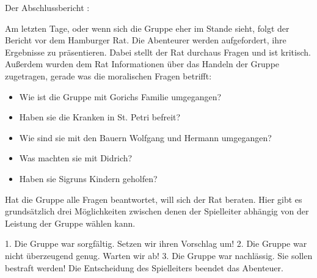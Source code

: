 Der Abschlussbericht
:

Am letzten Tage, oder wenn sich die Gruppe eher im Stande sieht, folgt der Bericht vor dem Hamburger Rat. Die Abenteurer werden aufgefordert, ihre Ergebnisse zu präsentieren. Dabei stellt der Rat durchaus Fragen und ist kritisch. Außerdem wurden dem Rat Informationen über das Handeln der Gruppe zugetragen, gerade was die moralischen Fragen betrifft:

\begin{itemize}
  \item Wie ist die Gruppe mit Gorichs Familie umgegangen?
  \item Haben sie die Kranken in St. Petri befreit?
  \item Wie sind sie mit den Bauern Wolfgang und Hermann umgegangen?
  \item Was machten sie mit Didrich?
  \item Haben sie Sigruns Kindern geholfen?
\end{itemize}

Hat die Gruppe alle Fragen beantwortet, will sich der Rat beraten. Hier gibt es grundsätzlich drei Möglichkeiten zwischen denen der Spielleiter abhängig von der Leistung der Gruppe wählen kann.

1. Die Gruppe war sorgfältig. Setzen wir ihren Vorschlag um!
2. Die Gruppe war nicht überzeugend genug. Warten wir ab!
3. Die Gruppe war nachlässig. Sie sollen bestraft werden!
Die Entscheidung des Spielleiters beendet das Abenteuer.
